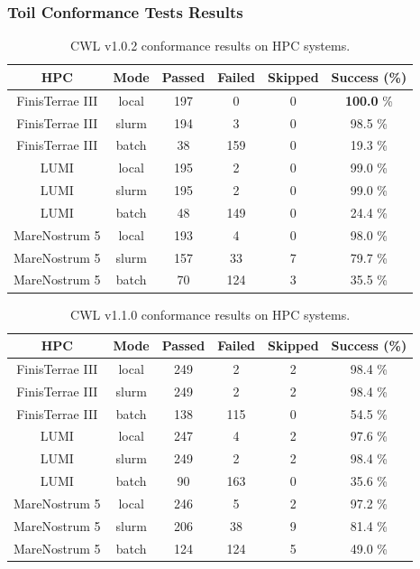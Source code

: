 \documentclass{article}
\begin{document}
\subsubsection*{Toil Conformance Tests Results}
\begin{table}[ht!]
\centering
\setlength{\tabcolsep}{6pt}
\renewcommand{\arraystretch}{1.2}
\begin{tabular}{|c|c|c|c|c|c|}
\hline
\rowcolor{lightgray!50}
\textbf{HPC} & \textbf{Mode} & \textbf{Passed} & \textbf{Failed} & \textbf{Skipped} & \textbf{Success (\%)} \\
\hline
FinisTerrae III & local & 197 & 0 & 0 & \textbf{100.0} \% \\
FinisTerrae III & slurm & 194 & 3 & 0 & 98.5 \% \\
FinisTerrae III & batch & 38 & 159 & 0 & 19.3 \% \\
\hline\hline
LUMI & local & 195 & 2 & 0 & 99.0 \% \\
LUMI & slurm & 195 & 2 & 0 & 99.0 \% \\
LUMI & batch & 48 & 149 & 0 & 24.4 \% \\
\hline\hline
MareNostrum 5 & local & 193 & 4 & 0 & 98.0 \% \\
MareNostrum 5 & slurm & 157 & 33 & 7 & 79.7 \% \\
MareNostrum 5 & batch & 70 & 124 & 3 & 35.5 \% \\
\hline
\end{tabular}
\caption{CWL v1.0.2 conformance results on HPC systems.}
\label{tab:toil_v10}
\end{table}
\begin{table}[ht!]
\centering
\setlength{\tabcolsep}{6pt}
\renewcommand{\arraystretch}{1.2}
\begin{tabular}{|c|c|c|c|c|c|}
\hline
\rowcolor{lightgray!50}
\textbf{HPC} & \textbf{Mode} & \textbf{Passed} & \textbf{Failed} & \textbf{Skipped} & \textbf{Success (\%)} \\
\hline
FinisTerrae III & local & 249 & 2 & 2 & 98.4 \% \\
FinisTerrae III & slurm & 249 & 2 & 2 & 98.4 \% \\
FinisTerrae III & batch & 138 & 115 & 0 & 54.5 \% \\
\hline\hline
LUMI & local & 247 & 4 & 2 & 97.6 \% \\
LUMI & slurm & 249 & 2 & 2 & 98.4 \% \\
LUMI & batch & 90 & 163 & 0 & 35.6 \% \\
\hline\hline
MareNostrum 5 & local & 246 & 5 & 2 & 97.2 \% \\
MareNostrum 5 & slurm & 206 & 38 & 9 & 81.4 \% \\
MareNostrum 5 & batch & 124 & 124 & 5 & 49.0 \% \\
\hline
\end{tabular}
\caption{CWL v1.1.0 conformance results on HPC systems.}
\label{tab:toil_v11}
\end{table}
\end{document}
